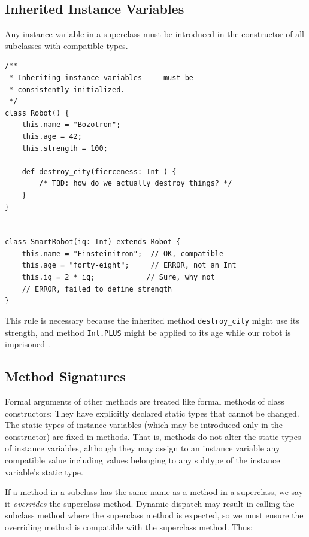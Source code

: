 \documentclass[11pt]{article}
\begin{document}
\subsection{Inherited Instance Variables}

Any instance variable in a superclass must be introduced in the
constructor of all subclasses with compatible types. 

\begin{verbatim}
/**
 * Inheriting instance variables --- must be
 * consistently initialized.
 */
class Robot() {
    this.name = "Bozotron";
    this.age = 42;
    this.strength = 100;

    def destroy_city(fierceness: Int ) {
    	/* TBD: how do we actually destroy things? */
    }
}


class SmartRobot(iq: Int) extends Robot {
    this.name = "Einsteinitron";  // OK, compatible
    this.age = "forty-eight";     // ERROR, not an Int
    this.iq = 2 * iq;            // Sure, why not
    // ERROR, failed to define strength
}
\end{verbatim}

This rule is necessary because the inherited method
\verb|destroy_city| might use its strength, and method \verb|Int.PLUS|
might be applied to its age 
while our robot is imprisoned . 

\subsection{Method Signatures}

Formal arguments of other methods are treated like formal methods of
class constructors:  They have explicitly declared static types that
cannot be changed.  The static types of instance variables (which may
be introduced only in the constructor) are fixed in methods.  That is,
methods do not alter the static types of instance variables, although
they may assign to an instance variable any compatible value including
values belonging to any subtype of the instance variable's static
type. 

If a method in a subclass has the same name as a method in a
superclass, we say it \emph{overrides} the superclass method.  Dynamic
dispatch may result in calling the subclass method where the
superclass method is expected, so we must ensure the overriding method
is compatible with the superclass method.   Thus: 
\end{document}
